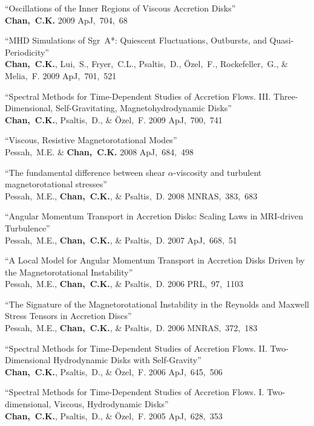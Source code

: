 \begin{ilist}
\item ``Oscillations of the Inner Regions of Viscous Accretion Disks''\\
  \textbf{Chan,~C.K.}
  2009 ApJ,~704,~68

\item ``MHD Simulations of Sgr~A*: Quiescent Fluctuations, Outbursts, and Quasi-Periodicity''\\
  \textbf{Chan,~C.K.}, Lui,~S., Fryer,~C.L., Psaltis,~D., \"Ozel,~F., Rockefeller,~G., \& Melia,~F.
  2009 ApJ,~701,~521

\item ``Spectral Methods for Time-Dependent Studies of Accretion Flows.
  III. Three-Dimensional, Self-Gravitating, Magnetohydrodynamic Disks''\\
  \textbf{Chan,~C.K.}, Psaltis,~D., \& \"Ozel,~F.
  2009 ApJ,~700,~741

\item ``Viscous, Resistive Magnetorotational Modes''\\
  Pessah,~M.E. \& \textbf{Chan,~C.K.}
  2008 ApJ,~684,~498

\item ``The fundamental difference between shear $\alpha$-viscosity and turbulent magnetorotational stresses''\\
  Pessah,~M.E., \textbf{Chan,~C.K.}, \& Psaltis,~D.
  2008 MNRAS,~383,~683

\item ``Angular Momentum Transport in Accretion Disks: Scaling Laws in MRI-driven Turbulence''\\
  Pessah,~M.E., \textbf{Chan,~C.K.}, \& Psaltis,~D.
  2007 ApJ,~668,~51

\item ``A Local Model for Angular Momentum Transport in Accretion Disks Driven by the Magnetorotational Instability''\\
  Pessah,~M.E., \textbf{Chan,~C.K.}, \& Psaltis,~D.
  2006 PRL,~97,~1103

\item ``The Signature of the Magnetorotational Instability in the Reynolds and Maxwell Stress Tensors in Accretion Discs''\\
  Pessah,~M.E., \textbf{Chan,~C.K.}, \& Psaltis,~D.
  2006 MNRAS,~372,~183

\item ``Spectral Methods for Time-Dependent Studies of Accretion Flows.
  II. Two-Dimensional Hydrodynamic Disks with Self-Gravity''\\
  \textbf{Chan,~C.K.}, Psaltis,~D., \& \"Ozel,~F.
  2006 ApJ,~645,~506

\item ``Spectral Methods for Time-Dependent Studies of Accretion Flows.
  I. Two-dimensional, Viscous, Hydrodynamic Disks''\\
  \textbf{Chan,~C.K.}, Psaltis,~D., \& \"Ozel,~F.
  2005 ApJ,~628,~353

\end{ilist}
